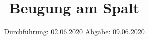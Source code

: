 

\subject{Versuch Nr. 406}
\title{Beugung am Spalt}
\date{%
  Durchführung: 02.06.2020
  \hspace{3em}
  Abgabe: 09.06.2020
}


\setlength{\parindent}{0pt} %

\maketitle
\thispagestyle{empty}
\tableofcontents
\newpage








\printbibliography{}


